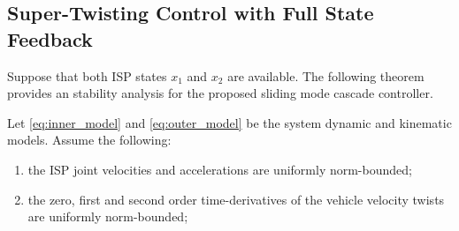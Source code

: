\subsection{Super-Twisting Control with Full State Feedback}
\label{sec:STC_state_feedback}

Suppose that both ISP states $x_1$ and $x_2$ are available.
%
The following theorem provides an stability analysis for the proposed sliding mode cascade controller.

\begin{theorem}

Let \eqref{eq:inner_model} and \eqref{eq:outer_model} be the system dynamic and kinematic models.
%
Assume the following:
%
\begin{enumerate}[label=(\roman*)]
%
\item the ISP joint velocities and accelerations are uniformly norm-bounded; \label{assump:1}
%
\item 
the zero, first and second order time-derivatives of the vehicle velocity twists are uniformly norm-bounded; \label{assump:2}
%
\end{enumerate}


\end{theorem}

